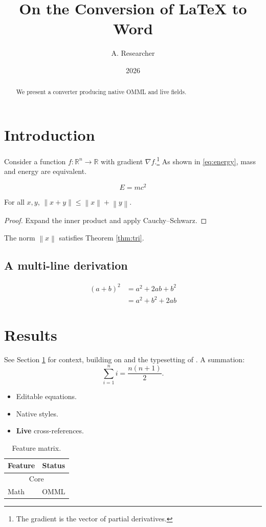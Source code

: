 \documentclass{article}
\title{On the Conversion of \LaTeX{} to Word}
\author{A. Researcher}
\date{2026}
\newcommand{\R}{\mathbb{R}}
\newcommand{\norm}[1]{\left\| #1 \right\|}
\begin{document}
\maketitle

\begin{abstract}
We present a converter producing native OMML and live fields.
\end{abstract}

\section{Introduction}\label{sec:intro}
Consider a function $f : \R^n \to \R$ with gradient $\nabla f$.\footnote{The
gradient is the vector of partial derivatives.}
As shown in \eqref{eq:energy}, mass and energy are equivalent.

\begin{equation}\label{eq:energy}
E = mc^2
\end{equation}

\begin{theorem}\label{thm:tri}
For all $x, y$, $\norm{x + y} \leq \norm{x} + \norm{y}$.
\end{theorem}

\begin{proof}
Expand the inner product and apply Cauchy--Schwarz.
\end{proof}

The norm $\norm{x}$ satisfies Theorem \ref{thm:tri}.

\subsection{A multi-line derivation}
\begin{align}
(a+b)^2 &= a^2 + 2ab + b^2 \\
        &= a^2 + b^2 + 2ab
\end{align}

\section{Results}\label{sec:results}
See Section \ref{sec:intro} for context, building on \cite{einstein1905}
and the typesetting of \cite{knuth1984}. A summation:
\[
\sum_{i=1}^{n} i = \frac{n(n+1)}{2}.
\]

\begin{itemize}
\item Editable equations.
\item Native styles.
\item \textbf{Live} cross-references.
\end{itemize}

\begin{table}
\begin{tabular}{lc}
\toprule
Feature & Status \\
\midrule
\multicolumn{2}{c}{Core} \\
Math & OMML \\
\bottomrule
\end{tabular}
\caption{Feature matrix.}\label{tab:features}
\end{table}



\end{document}
